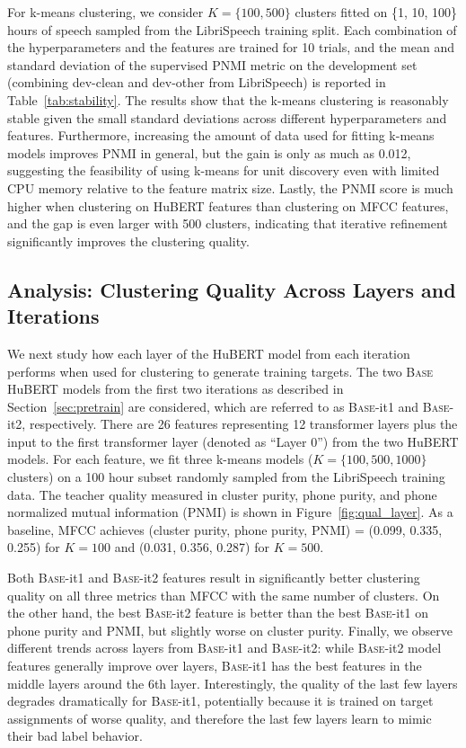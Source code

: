 For k-means clustering, we consider $K=\{100,500\}$ clusters fitted on \{1, 10, 100\} hours of speech sampled from the LibriSpeech training split. Each combination of the hyperparameters and the features are trained for 10 trials, and the mean and standard deviation of the supervised PNMI metric on the development set (combining dev-clean and dev-other from LibriSpeech) is reported in Table~\ref{tab:stability}.
The results show that the k-means clustering is reasonably stable given the small standard deviations across different hyperparameters and features. Furthermore, increasing the amount of data used for fitting k-means models improves PNMI in general, but the gain is only as much as 0.012, suggesting the feasibility of using k-means for unit discovery even with limited CPU memory relative to the feature matrix size. Lastly, the PNMI score is much higher when clustering on HuBERT features than clustering on MFCC features, and the gap is even larger with 500 clusters, indicating that iterative refinement significantly improves the clustering quality.

\subsection{Analysis: Clustering Quality Across Layers and Iterations} We next study how each layer of the HuBERT model from each iteration performs when used for clustering to generate training targets. The two \textsc{Base} HuBERT models from the first two iterations as described in Section~\ref{sec:pretrain} are considered, which are referred to as \textsc{Base}-it1 and \textsc{Base}-it2, respectively. There are 26 features representing 12 transformer layers plus the input to the first transformer layer (denoted as ``Layer 0'') from the two HuBERT models. For each feature, we fit three k-means models ($K=\{100, 500, 1000\}$ clusters) on a 100 hour subset randomly sampled from the LibriSpeech training data. The teacher quality measured in cluster purity, phone purity, and phone normalized mutual information (PNMI) is shown in Figure~\ref{fig:qual_layer}.
As a baseline, MFCC achieves (cluster purity, phone purity, PNMI) = (0.099, 0.335, 0.255) for $K=100$ and (0.031, 0.356, 0.287) for $K=500$.

Both \textsc{Base}-it1 and \textsc{Base}-it2 features result in significantly better clustering quality on all three metrics than MFCC with the same number of clusters. On the other hand, the best \textsc{Base}-it2 feature is better than the best \textsc{Base}-it1 on phone purity and PNMI, but slightly worse on cluster purity. Finally, we observe different trends across layers from \textsc{Base}-it1 and \textsc{Base}-it2: while \textsc{Base}-it2 model features generally improve over layers, \textsc{Base}-it1 has the best features in the middle layers around the 6th layer. Interestingly, the quality of the last few layers degrades dramatically for \textsc{Base}-it1, potentially because it is trained on target assignments of worse quality, and therefore the last few layers learn to mimic their bad label behavior.

